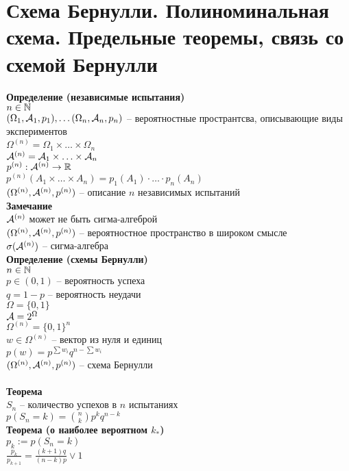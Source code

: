\documentclass[12pt]{article}
\begin{document}
\section{Схема Бернулли. Полиноминальная схема. Предельные теоремы, связь со схемой Бернулли}
\textbf{Определение (независимые испытания)}\\
$n \in \mathbb{N}$\\
$(\Omega_1, \mathcal{A}_1, p_1), \ldots (\Omega_n, \mathcal{A}_n, p_n)$ -- вероятностные пространтсва, описывающие виды экспериментов\\
$\Omega^{(n)} = \Omega_1 \times \ldots \times \Omega_n$\\
$\mathcal{A}^{(n)} = \mathcal{A}_1 \times \ldots \times \mathcal{A}_n$\\
$p^{(n)}: \mathcal{A}^{(n)} \rightarrow \mathbb{R}$\\
$p^{(n)}(A_1\times \ldots \times A_n) = p_1(A_1)\cdot\ldots\cdot p_n(A_n)$\\
$(\Omega^{(n)}, \mathcal{A}^{(n)}, p^{(n)})$ -- описание $n$ независимых испытаний\\
\textbf{Замечание}\\
$\mathcal{A}^{(n)}$ может не быть сигма-алгеброй\\
$(\Omega^{(n)}, \mathcal{A}^{(n)}, p^{(n)})$ -- вероятностное пространство в широком смысле\\
$\sigma(\mathcal{A}^{(n)})$ -- сигма-алгебра\\
\textbf{Определение (схемы Бернулли)}\\
$n \in \mathbb{N}$\\
$p \in (0, 1)$ -- вероятность успеха\\
$q = 1 - p$ -- вероятность неудачи\\
$\Omega = \{0, 1\}$\\
$\mathcal{A} = 2^\Omega$\\
$\Omega^{(n)} = \{0, 1\}^n$\\
$w \in \Omega^{(n)}$ -- вектор из нуля и единиц\\
$p(w) = p^{\sum w_i}q^{n-\sum w_i}$\\
$(\Omega^{(n)}, \mathcal{A}^{(n)}, p^{(n)})$ -- схема Бернулли\\\\
\textbf{Теорема}\\
$S_n$ -- количество успехов в $n$ испытаниях\\
$p(S_n = k) = \binom{n}{k} p^k q^{n-k}$\\
\textbf{Теорема (о наиболее вероятном $k_*$)}\\
$p_k := p(S_n = k)$\\
$\frac{p_k}{p_{k+1}} = \frac{(k+1)q}{(n-k)p} \vee 1$\\
\end{document}
